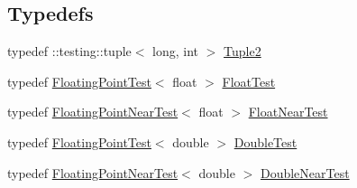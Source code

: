 \subsection*{Typedefs}
\begin{DoxyCompactItemize}
\item 
typedef \+::testing\+::tuple$<$ long, int $>$ \hyperlink{namespacetesting_1_1gmock__matchers__test_a8b82c859cd28da9e7f7d4c6091a3165c}{Tuple2}
\item 
typedef \hyperlink{classtesting_1_1gmock__matchers__test_1_1FloatingPointTest}{Floating\+Point\+Test}$<$ float $>$ \hyperlink{namespacetesting_1_1gmock__matchers__test_a145329e433869625f9f0e98a0cdfd7b4}{Float\+Test}
\item 
typedef \hyperlink{classtesting_1_1gmock__matchers__test_1_1FloatingPointNearTest}{Floating\+Point\+Near\+Test}$<$ float $>$ \hyperlink{namespacetesting_1_1gmock__matchers__test_a426b51f464dcb48033946e1bf3cc8795}{Float\+Near\+Test}
\item 
typedef \hyperlink{classtesting_1_1gmock__matchers__test_1_1FloatingPointTest}{Floating\+Point\+Test}$<$ double $>$ \hyperlink{namespacetesting_1_1gmock__matchers__test_a944cdd366ed240f29ae8e3ebc753ad5c}{Double\+Test}
\item 
typedef \hyperlink{classtesting_1_1gmock__matchers__test_1_1FloatingPointNearTest}{Floating\+Point\+Near\+Test}$<$ double $>$ \hyperlink{namespacetesting_1_1gmock__matchers__test_aea537d0183ccc65b5c49a75d711993c8}{Double\+Near\+Test}
\end{DoxyCompactItemize}
